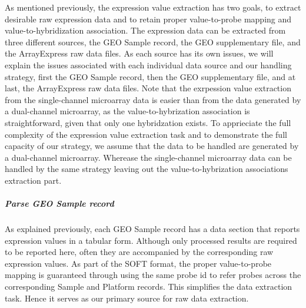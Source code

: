 

As mentioned previously, the expression value extraction has two goals, to
extract desirable raw expression data and to retain proper value-to-probe
mapping and value-to-hybridization association.
%
The expression data can be extracted from three different sources, the GEO
Sample record, the GEO supplementary file, and the ArrayExpress raw data files.
%
As each source has its own issues, we will explain the issues associated with
each individual data source and our handling strategy, first the GEO Sample
record, then the GEO supplementary file, and at last, the ArrayExpress raw
data files.
%
Note that the exrpession value extraction from the single-channel microarray
data is easier than from the data generated by a dual-channel microarray, as
the value-to-hybrization association is straightforward, given that only one
hybridzation exists.
%
To apprieciate the full complexity of the expression value extraction task
and to demonstrate the full capacity of our strategy, we assume that the data
to be handled are generated by a dual-channel microarray.  
%
Wherease the single-channel microarray data can be handled by the same
strategy leaving out the value-to-hybrization associations extraction part.



\subparagraph{\textit{Parse GEO Sample record}}

As explained previously, each GEO Sample record has a data section that reports
expression values in a tabular form.
%
Although only processed results are required to be reported here, often they
are accompanied by the corresponding raw expression values.
%
As part of the SOFT format, the proper value-to-probe mapping is guaranteed
through using the same probe id to refer probes across the corresponding Sample
and Platform records.
%
This simplifies the data extraction task. 
%
Hence it serves as our primary source for raw data extraction.

